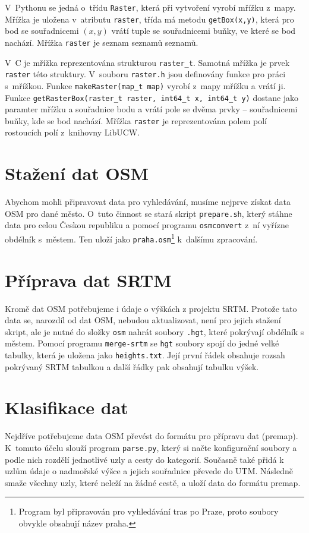 V~Pythonu se jedná o~třídu \verb|Raster|, která při vytvoření vyrobí mřížku
z~mapy. Mřížka je uložena v~atributu \verb|raster|, třída má metodu
\verb|getBox(x,y)|, která pro bod se souřadnicemi $(x,y)$ vrátí tuple se
souřadnicemi buňky, ve které se bod nachází. Mřížka \verb|raster| je seznam
seznamů seznamů.

V~C je mřížka reprezentována strukturou \verb|raster_t|. Samotná mřížka je prvek
\verb|raster| této struktury. V~souboru \verb|raster.h| jsou definovány funkce
pro práci s~mřížkou. Funkce \verb|makeRaster(map_t map)| vyrobí z~mapy mřížku a
vrátí ji. Funkce \verb|getRasterBox(raster_t raster, int64_t x, int64_t y)|
dostane jako paramter mřížku a souřadnice bodu a vrátí pole se dvěma prvky --
souřadnicemi buňky, kde se bod nachází. Mřížka \verb|raster| je reprezentována
polem polí rostoucích polí z~knihovny LibUCW.

\medskip


\section{Stažení dat OSM}
Abychom mohli připravovat data pro vyhledávání, musíme nejprve získat data OSM
pro dané město. O~tuto činnost se stará skript \verb|prepare.sh|, který stáhne
data pro celou Českou republiku a pomocí programu \verb|osmconvert| z~ní vyřízne
obdélník s~městem. Ten uloží jako \verb|praha.osm|\footnote{Program byl
připravován pro vyhledávání tras po Praze, proto soubory obvykle obsahují název
praha.} k~dalšímu zpracování.

\section{Příprava dat SRTM}
Kromě dat OSM potřebujeme i údaje o výškách z projektu SRTM. Protože tato data
se, narozdíl od dat OSM, nebudou aktualizovat, není pro jejich stažení skript,
ale je nutné do složky \verb|osm| nahrát soubory \verb|.hgt|, které pokrývají
obdélník s městem. Pomocí programu \verb|merge-srtm| se \verb|hgt| soubory spojí
do jedné velké tabulky, která je uložena jako \verb|heights.txt|. Její první
řádek obsahuje rozsah pokrývaný SRTM tabulkou a další řádky pak obsahují tabulku
výšek.

\section{Klasifikace dat}
Nejdříve potřebujeme data OSM převést do formátu pro přípravu dat (premap).
K~tomuto účelu slouží program \verb|parse.py|, který si načte konfigurační soubory
a podle nich rozdělí jednotlivé uzly a cesty do kategorií. Současně také přidá k
uzlům údaje o nadmořské výšce a jejich souřadnice převede do UTM. Následně smaže 
všechny uzly, které neleží na žádné cestě, a uloží data do formátu premap.

